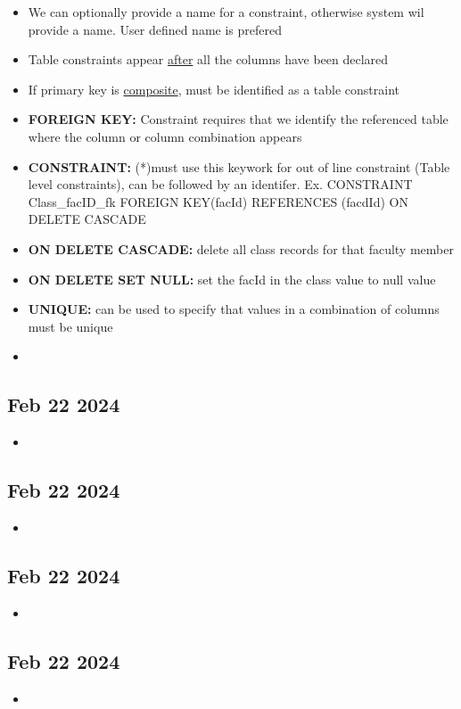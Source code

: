 \documentclass[12pt]{article}
\begin{document}
\begin{itemize}
		\item We can optionally provide a name for a constraint, otherwise system wil provide a name. User defined
	  		name is prefered	
		\item Table constraints appear \underline{after} all the columns have been declared
		\item If primary key is \underline{composite}, must be identified as a table constraint
		\item \textbf{FOREIGN KEY:} Constraint requires that we identify the referenced table where the column
			or column combination appears
		\item \textbf{CONSTRAINT:} (*)must use this keywork for out of line constraint (Table level constraints), 
			can be followed by an identifer. Ex. CONSTRAINT Class\_facID\_fk FOREIGN KEY(facId) REFERENCES (facdId)
			ON DELETE CASCADE  
		\item \textbf{ON DELETE CASCADE:} delete all class records for that faculty member
		\item \textbf{ON DELETE SET NULL:} set the facId in the class value to null value
		\item \textbf{UNIQUE:} can be used to specify that values in a combination of columns must be unique 
		\item \textbf{} 
\end{itemize}

\subsection*{Feb 22 2024}

\begin{itemize}
		\item
\end{itemize}

\subsection*{Feb 22 2024}

\begin{itemize}
		\item
\end{itemize}

\subsection*{Feb 22 2024}

\begin{itemize}
		\item
\end{itemize}

\subsection*{Feb 22 2024}

\begin{itemize}
		\item
\end{itemize}
\end{document}
